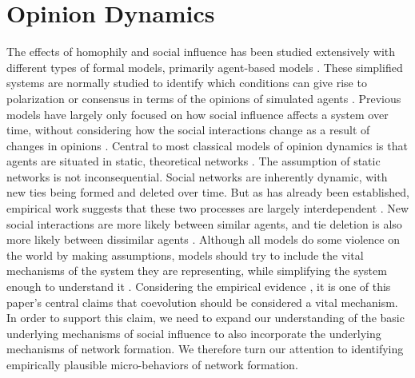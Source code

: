 \documentclass{article}
\begin{document}
\section{Opinion Dynamics}
The effects of homophily and social influence has been studied extensively with different types of formal models, primarily agent-based models \cite{flache_models_2017,flache_between_2018,noorazar_classical_2020}. These simplified systems are normally studied to identify which conditions can give rise to polarization or consensus in terms of the opinions of simulated agents \cite{flache_models_2017}. Previous models have largely only focused on how social influence affects a system over time, without considering how the social interactions change as a result of changes in opinions \cite{galesic_integrating_2021,holme_nonequilibrium_2006,jalili_coevolution_2015}. Central to most classical models of opinion dynamics is that agents are situated in static, theoretical networks \cite{flache_models_2017}. The assumption of static networks is not inconsequential. Social networks are inherently dynamic, with new ties being formed and deleted over time.  But as has already been established, empirical work suggests that these two processes are largely interdependent \cite{bener_empirical_2016,kossinets_origins_2009}. New social interactions are more likely between similar agents, and tie deletion is also more likely between dissimilar agents \cite{kossinets_origins_2009}. 
Although all models do some violence on the world by making assumptions, models should try to include the vital mechanisms of the system they are representing, while simplifying the system enough to understand it \cite{epstein1999agent,smaldino_models_2016}. Considering the empirical evidence \cite{bener_empirical_2016,crandall_feedback_2008,kossinets_origins_2009}, it is one of this paper’s central claims that coevolution should be considered a vital mechanism. In order to support this claim, we need to expand our understanding of the basic underlying mechanisms of social influence to also incorporate the underlying mechanisms of network formation. We therefore turn our attention to identifying empirically plausible micro-behaviors of network formation. 
\end{document}
